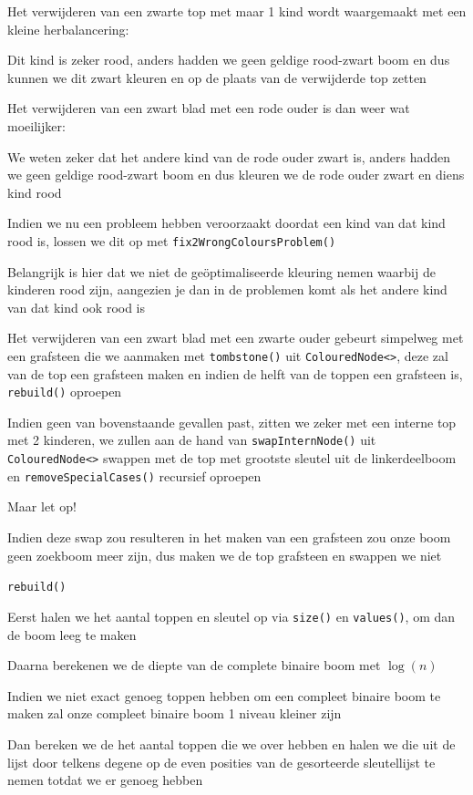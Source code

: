 \documentclass{article}
\def\code#1{\texttt{#1}}
\begin{document}
Het verwijderen van een zwarte top met maar 1 kind wordt waargemaakt met een kleine herbalancering:

Dit kind is zeker rood, anders hadden we geen geldige rood-zwart boom en dus kunnen we dit zwart kleuren en op de plaats van de verwijderde top zetten

Het verwijderen van een zwart blad met een rode ouder is dan weer wat moeilijker:

We weten zeker dat het andere kind van de rode ouder zwart is, anders hadden we geen geldige rood-zwart boom en dus kleuren we de rode ouder zwart en diens kind rood

Indien we nu een probleem hebben veroorzaakt doordat een kind van dat kind rood is, lossen we dit op met \code{fix2WrongColoursProblem()}

Belangrijk is hier dat we niet de geöptimaliseerde kleuring nemen waarbij de kinderen rood zijn, aangezien je dan in de problemen komt als het andere kind van dat kind ook rood is

Het verwijderen van een zwart blad met een zwarte ouder gebeurt simpelweg met een grafsteen die we aanmaken met \code{tombstone()} uit \code{ColouredNode<>}, deze zal van de top een grafsteen maken en indien de helft van de toppen een grafsteen is, \code{rebuild()} oproepen

Indien geen van bovenstaande gevallen past, zitten we zeker met een interne top met 2 kinderen, we zullen aan de hand van \code{swapInternNode()} uit \code{ColouredNode<>} swappen met de top met grootste sleutel uit de linkerdeelboom en \code{removeSpecialCases()} recursief oproepen

Maar let op!

Indien deze swap zou resulteren in het maken van een grafsteen zou onze boom geen zoekboom meer zijn, dus maken we de top grafsteen en swappen we niet

\newpage

\code{rebuild()}

Eerst halen we het aantal toppen en sleutel op via \code{size()} en \code{values()}, om dan de boom leeg te maken

Daarna berekenen we de diepte van de complete binaire boom met $\log(n)$

Indien we niet exact genoeg toppen hebben om een compleet binaire boom te maken zal onze compleet binaire boom 1 niveau kleiner zijn

Dan bereken we de het aantal toppen die we over hebben en halen we die uit de lijst door telkens degene op de even posities van de gesorteerde sleutellijst te nemen totdat we er genoeg hebben
\end{document}
